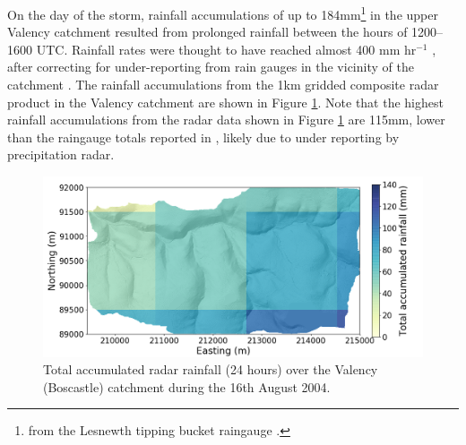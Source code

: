 On the day of the storm, rainfall accumulations of up to 184mm\footnote{from the Lesnewth tipping bucket raingauge \citep{golding2005boscastle}.} in the upper Valency catchment resulted from prolonged rainfall between the hours of 1200--1600 UTC. Rainfall rates were thought to have reached almost 400 mm hr\(^{-1}\) \citep{golding2005boscastle}, after correcting for under-reporting from rain gauges in the vicinity of the catchment \citep{burt2005cloudburst}. The rainfall accumulations from the 1km gridded composite radar product in the Valency catchment are shown in Figure \ref{fig_boscastle_rain_totals}. Note that the highest rainfall accumulations from the radar data shown in Figure \ref{fig_boscastle_rain_totals} are 115mm, lower than the raingauge totals reported in \citet{golding2005boscastle}, likely due to under reporting by precipitation radar. 


\begin{figure}[htb]
\includegraphics[width=15cm]{chp_events_figures_scripts/figure_boscastle_total_rainfall.png}
\caption{Total accumulated radar rainfall (24 hours) over the Valency (Boscastle) catchment during the 16th August 2004.}
\label{fig_boscastle_rain_totals}
\end{figure}



